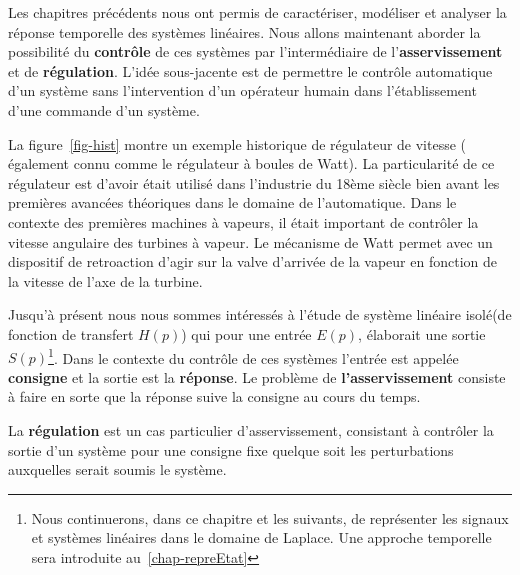 Les chapitres précédents nous ont permis de caractériser, modéliser et
analyser la réponse temporelle des systèmes linéaires.
Nous allons maintenant aborder la possibilité du \textbf{contrôle} de ces 
systèmes par l'intermédiaire de l'\textbf{asservissement} et de 
\textbf{régulation}. 
L'idée sous-jacente est de permettre le contrôle automatique d'un système
sans l'intervention d'un opérateur humain dans l'établissement d'une commande
d'un système. 

La figure~\ref{fig-hist} montre un exemple historique de régulateur de 
vitesse ( également connu comme le régulateur à boules de Watt). 
La particularité de ce régulateur est d'avoir était utilisé dans l'industrie
du 18ème siècle bien avant les premières avancées théoriques dans le domaine 
de l'automatique. Dans le contexte des premières machines à vapeurs, 
il était important de contrôler la vitesse angulaire des turbines à vapeur. 
Le mécanisme de Watt permet avec un dispositif de retroaction d'agir sur la 
valve d'arrivée de la vapeur en fonction de la vitesse de l'axe de la turbine.

\clearpage
Jusqu'à présent nous nous sommes intéressés à l'étude de système 
linéaire \og isolé\fg (de fonction de transfert $H(p)$) 
qui pour une entrée $E(p)$, élaborait une sortie $S(p)$\footnote{Nous
continuerons, dans ce chapitre et les suivants, de représenter 
les signaux et systèmes linéaires dans le domaine de Laplace. Une approche 
temporelle sera introduite au~\cref{chap-repreEtat}}. Dans le contexte du 
contrôle de ces systèmes l'entrée est appelée \textbf{consigne} et la sortie
est la \textbf{réponse}. Le problème de \textbf{l'asservissement} consiste 
à faire en sorte que la réponse suive la consigne au cours du temps.

La \textbf{régulation} est un cas particulier d'asservissement, consistant
à contrôler la sortie d'un système pour une consigne fixe quelque soit 
les perturbations auxquelles serait soumis le système.

%                                      
%                                      
%
\begin{center}
\end{center}

